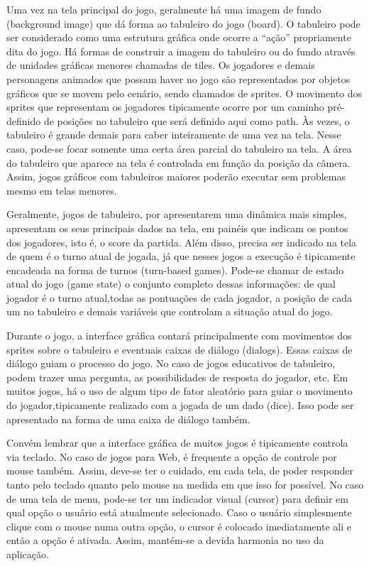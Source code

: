 Uma vez na tela principal do jogo, geralmente há uma imagem de fundo (background image) que dá forma ao tabuleiro do jogo (board). O tabuleiro pode ser considerado como uma estrutura gráfica onde ocorre a “ação” propriamente dita do jogo. Há formas de construir a imagem do tabuleiro ou do fundo através de unidades gráficas menores chamadas de tiles. Os jogadores e demais personagens animados que possam haver no jogo são representados por objetos gráficos que se movem pelo cenário, sendo chamados de sprites. O movimento dos sprites que representam os jogadores tipicamente ocorre por um caminho pré-definido de posições no tabuleiro que será definido aqui como path.
Às vezes, o tabuleiro é grande demais para caber inteiramente de uma vez na tela. Nesse caso, pode-se focar somente uma certa área parcial do tabuleiro na tela. A área do tabuleiro que aparece na tela é controlada em função da posição da câmera. Assim, jogos gráficos com tabuleiros maiores poderão executar sem problemas mesmo em telas menores.

Geralmente, jogos de tabuleiro, por apresentarem uma dinâmica mais simples, apresentam os seus principais dados na tela, em painéis que indicam os pontos dos jogadores, isto é, o score da partida. Além disso, precisa ser indicado na tela de quem é o turno atual de jogada, já que nesses jogos a execução é tipicamente encadeada na forma de turnos (turn-based games). Pode-se chamar de estado atual do jogo (game state) o conjunto completo dessas informações: de qual jogador é o turno atual,todas as pontuações de cada jogador, a posição de cada um no tabuleiro e demais variáveis que controlam a situação atual do jogo.

Durante o jogo, a interface gráfica contará principalmente com movimentos dos sprites sobre o tabuleiro e eventuais caixas de diálogo (dialogs). Essas caixas de diálogo guiam o processo do jogo. No caso de jogos educativos de tabuleiro, podem trazer uma pergunta, as possibilidades de resposta do jogador, etc. Em muitos jogos, há o uso de algum tipo de fator aleatório para guiar o movimento do jogador,tipicamente realizado com a jogada de um dado (dice). Isso pode ser apresentado na forma de uma caixa de diálogo também.

Convém lembrar que a interface gráfica de muitos jogos é tipicamente controla via teclado. No caso de jogos para Web, é frequente a opção de controle por mouse também. Assim, deve-se ter o cuidado, em cada tela, de poder responder tanto pelo teclado quanto pelo mouse na medida em que isso for possível. No caso de uma tela de menu, pode-se ter um indicador visual (cursor) para definir em qual opção o usuário está atualmente selecionado. Caso o usuário simplesmente clique com o mouse numa outra opção, o cursor é colocado imediatamente ali e então a opção é ativada. Assim, mantém-se a devida harmonia no uso da aplicação.

